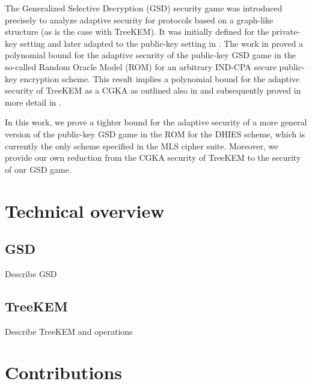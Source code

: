 The Generalized Selective Decryption (GSD) security game \cite{gsd} was introduced precisely to analyze adaptive security for protocols based on a graph-like structure (as is the case with TreeKEM). It was initially defined for the private-key setting and later adapted to the public-key setting in \cite{ttkem}. The work in \cite{ttkem} proved a polynomial bound for the adaptive security of the public-key GSD game in the so-called Random Oracle Model (ROM) for an arbitrary IND-CPA secure public-key encryption scheme. This result implies a polynomial bound for the adaptive security of TreeKEM as a CGKA as outlined also in \cite[Theorem 4]{ttkem} and subsequently proved in more detail in \cite[Theorem 12]{modular-group-messaging}.

In this work, we prove a tighter bound for the adaptive security of a more general version of the public-key GSD game in the ROM for the DHIES scheme, which is currently the only scheme specified in the MLS cipher suite. Moreover, we provide our own reduction from the CGKA security of TreeKEM to the security of our GSD game.

\section{Technical overview}

\subsection{GSD}

Describe GSD

\subsection{TreeKEM}

Describe TreeKEM and operations

\section{Contributions}


